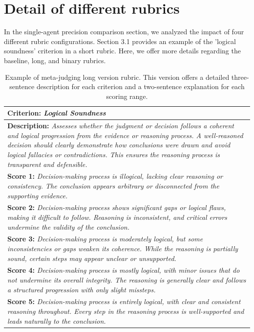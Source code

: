 \documentclass{article}
\theoremstyle{plain}
\theoremstyle{definition}
\theoremstyle{remark}
\begin{document}
\section{Detail of different rubrics}
In the single-agent precision comparison section, we analyzed the impact of four different rubric configurations. Section 3.1 provides an example of the 'logical soundness' criterion in a short rubric. Here, we offer more details regarding the baseline, long, and binary rubrics.
\begin{table}[h!]
    \centering
    \setlength{\tabcolsep}{8pt} %
    \renewcommand{\arraystretch}{1.5} %
    \begin{tabular}{p{}}
        \toprule
       \rowcolor{gray!20} \textbf{Criterion:} \textit{Logical Soundness} \\
        \midrule 
         \textbf{Description:} \newline
         \textit{Assesses whether the judgment or decision follows a coherent and logical progression from the evidence or reasoning process. 
        A well-reasoned decision should clearly demonstrate how conclusions were drawn and avoid logical fallacies or contradictions. 
        This ensures the reasoning process is transparent and defensible.} \\
        \midrule
         \textbf{Score 1:} \textit{Decision-making process is illogical, lacking clear reasoning or consistency. 
         The conclusion appears arbitrary or disconnected from the supporting evidence.}\\ 
         \textbf{Score 2:} \textit{Decision-making process shows significant gaps or logical flaws, making it difficult to follow. 
            Reasoning is inconsistent, and critical errors undermine the validity of the conclusion.}\\ 
         \textbf{Score 3:} \textit{Decision-making process is moderately logical, but some inconsistencies or gaps weaken its coherence. 
            While the reasoning is partially sound, certain steps may appear unclear or unsupported.}\\ 
         \textbf{Score 4:} \textit{Decision-making process is mostly logical, with minor issues that do not undermine its overall integrity. 
            The reasoning is generally clear and follows a structured progression with only slight missteps.}\\ 
         \textbf{Score 5:} \textit{Decision-making process is entirely logical, with clear and consistent reasoning throughout. 
            Every step in the reasoning process is well-supported and leads naturally to the conclusion.}\\ 
        \bottomrule
    \end{tabular}
    \caption{Example of meta-judging long version rubric. This version offers a detailed three-sentence description for each criterion and a two-sentence explanation for each scoring range.}
    \label{tab:rubric-describe-1}
\end{table}
\end{document}
